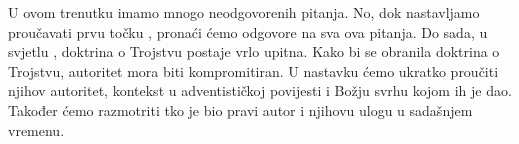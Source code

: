 U ovom trenutku imamo mnogo neodgovorenih pitanja. No, dok nastavljamo proučavati prvu točku , pronaći ćemo odgovore na sva ova pitanja. Do sada, u svjetlu , doktrina o Trojstvu postaje vrlo upitna. Kako bi se obranila doktrina o Trojstvu, autoritet  mora biti kompromitiran. U nastavku ćemo ukratko proučiti njihov autoritet, kontekst u adventističkoj povijesti i Božju svrhu kojom ih je dao. Također ćemo razmotriti tko je bio pravi autor  i njihovu ulogu u sadašnjem vremenu.
